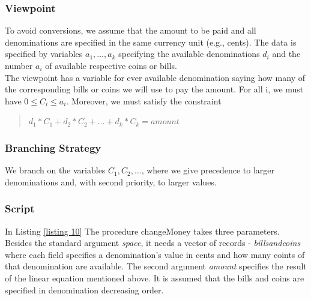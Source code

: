 \documentclass[a4paper]{scrartcl}
\begin{document}
\subsubsection{Viewpoint}
To avoid conversions, we assume that the amount to be paid and all 
denominations are specified in the same currency unit (e.g., cents). 
The data is specified by variables $ a_1, \ldots, a_k $ specifying 
the available denominations $ d_i $ and the number $ a_i $ of available 
respective coins or bills.\\ 

The viewpoint has a variable for ever available denomination saying how many 
of the corresponding bills or coins we will use to pay the amount. For all i, 
we must have $ 0 \leq C_i \leq a_i $. Moreover, we must satisfy the constraint 
\begin{quote}
$ d_1 * C_1 + d_2 * C_2 + \ldots + d_k * C_k = amount $
\end{quote}

\subsubsection{Branching Strategy}
We branch on the variables $ C_1, C_2, \ldots $, where we give precedence 
to larger denominations
and, with second priority, to larger values. 

\subsubsection{Script}
In Listing \ref{listing 10} 
The procedure changeMoney takes three parameters. Besides the standard
argument {\it space}, it needs a vector of records - {\it billsandcoins}
where each field specifies a denomination's value in cents and how many 
coints of that denomination are available. The second argument 
{\it amount} specifies the result of the linear equation mentioned above.
 It is assumed that the 
bills and coins are specified in denomination decreasing order.\\
\end{document}
